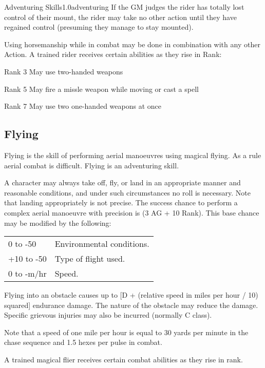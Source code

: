 \begin{skill}{Adventuring Skills}{1.0}{adventuring}
If the GM judges the rider has totally lost control of their mount,
the rider may take no other action until they have regained control
(presuming they manage to stay mounted).

Using horsemanship while in combat may be done in combination with any
other Action.  A trained rider receives certain abilities as they rise
in Rank:

\begin{Description}
\item[Rank 3] May use two-handed weapons 
\item[Rank 5] May fire a missle weapon while moving or cast a spell
\item[Rank 7] May use two one-handed weapons at once
\end{Description}


\subsection{Flying}

Flying is the skill of performing aerial manoeuvres using magical
flying. As a rule aerial combat is difficult. Flying is an adventuring
skill.

A character may always take off, fly, or land in an appropriate manner
and reasonable conditions, and under such circumstances no roll is
necessary. Note that landing appropriately is not precise. The success
chance to perform a complex aerial manoeuvre with precision is (3 \x
AG + 10 \x Rank). This base chance may be modified by the following:

\begin{tabularx}{\linewidth}{lX}
0 to -50       & Environmental conditions. \\
+10 to -50     & Type of flight used. \\
0 to -m/hr     & Speed. \\
\end{tabularx}

Flying into an obstacle causes up to [D + (relative speed in miles per
hour / 10) squared] endurance damage. The nature of the obstacle may
reduce the damage. Specific grievous injuries may also be incurred
(normally C class).

Note that a speed of one mile per hour is equal to 30 yards per minute
in the chase sequence and 1.5 hexes per pulse in combat.

A trained magical flier receives certain combat abilities as they rise
in rank.


\end{skill}
